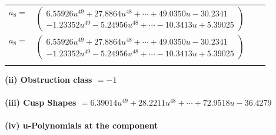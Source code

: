 \documentclass[1p]{elsarticle_modified}
\theoremstyle{definition}
\begin{document}
\begin{tabular}{m{7pt} m{180pt} m{7pt} m{180pt} }
\flushright $a_{8}=$&$\begin{pmatrix}6.55926 u^{49}+27.8864 u^{48}+\cdots+49.0350 u-30.2341\\-1.23352 u^{49}-5.24956 u^{48}+\cdots-10.3413 u+5.39025\end{pmatrix}$\\ \flushright $a_{8}=$&$\begin{pmatrix}6.55926 u^{49}+27.8864 u^{48}+\cdots+49.0350 u-30.2341\\-1.23352 u^{49}-5.24956 u^{48}+\cdots-10.3413 u+5.39025\end{pmatrix}$\\&\end{tabular}
\flushleft \textbf{(ii) Obstruction class $= -1$}\\~\\
\flushleft \textbf{(iii) Cusp Shapes $= 6.39014 u^{49}+28.2211 u^{48}+\cdots+72.9518 u-36.4279$}\\~\\
\newpage\renewcommand{\arraystretch}{1}
\flushleft \textbf{(iv) u-Polynomials at the component}\newline \\
\end{document}
